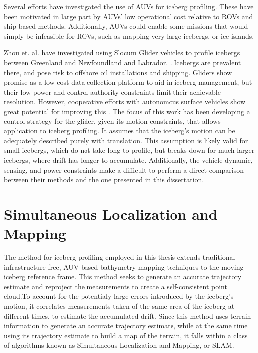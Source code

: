 Several efforts have investigated the use of AUVs for iceberg profiling. These have been motivated in large part by AUVs' low operational cost relative to ROVs and ship-based methods. Additionally, AUVs could enable some missions that would simply be infeasible for ROVs, such as mapping very large icebergs, or ice islands. 

Zhou et. al. have investigated using Slocum Glider vehicles to profile icebergs between Greenland and Newfoundland and Labrador. \cite{Zhou2014}. Icebergs are prevalent there, and pose risk to offshore oil installations and shipping. Gliders show promise as a low-cost data collection platform to aid in iceberg management, but their low power and control authority constraints limit their achievable resolution. However, cooperative efforts with autonomous surface vehicles show great potential for improving this \cite{Smith2014}. The focus of this work has been developing a control strategy for the glider, given its motion constraints, that allows application to iceberg profiling. It assumes that the iceberg's motion can be adequately described purely with translation. This assumption is likely valid for small icebergs, which do not take long to profile, but breaks down for much larger icebergs, where drift has longer to accumulate. Additionally, the vehicle dynamic, sensing, and power constraints make a difficult to perform a direct comparison between their methods and the one presented in this dissertation. 




\section{Simultaneous Localization and Mapping}

The method for iceberg profiling employed in this thesis extends traditional infrastructure-free, AUV-based bathymetry mapping techniques to the moving iceberg reference frame. This method seeks to generate an accurate trajectory estimate and reproject the measurements to create a self-consistent point cloud.To account for the potentialy large errors introduced by the iceberg's motion, it correlates measurements taken of the same area of the iceberg at different times, to estimate the accumulated drift. Since this method uses terrain information to generate an accurate trajectory estimate, while at the same time using its trajectory estimate to build a map of the terrain, it falls within a class of algorithms known as Simultaneous Localization and Mapping, or SLAM.

